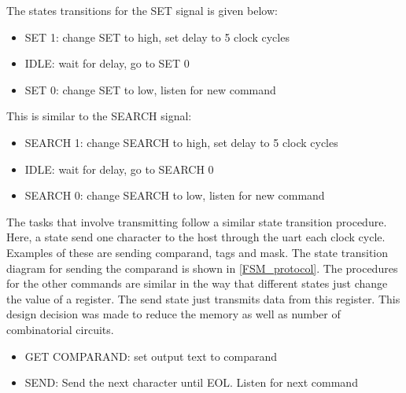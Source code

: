 The states transitions for the SET signal is given below:
\begin{itemize}
    \item  SET 1: change SET to high, set delay to 5 clock cycles
    \item  IDLE: wait for delay, go to SET 0
    \item  SET 0: change SET to low, listen for new command
\end{itemize}
\vspace{5mm}
This is similar to the SEARCH signal:
\begin{itemize}
    \item  SEARCH 1: change SEARCH to high, set delay to 5 clock cycles
    \item  IDLE: wait for delay, go to SEARCH 0
    \item  SEARCH 0: change SEARCH to low, listen for new command
\end{itemize}
\vspace{5mm}
The tasks that involve transmitting follow a similar state transition procedure. 
Here, a state send one character to the host through the uart each clock cycle. 
Examples of these are sending comparand, tags and mask. 
The state transition diagram for sending the comparand is shown in \ref{FSM_protocol}.
The procedures for the other commands are similar in the way that different states just change the value of a register. 
The send state just transmits data from this register. 
This design decision was made to reduce the memory as well as number of combinatorial circuits. 

\begin{itemize}
    \item  GET COMPARAND: set output text to comparand
    \item  SEND: Send the next character until EOL. Listen for next command
\end{itemize}
